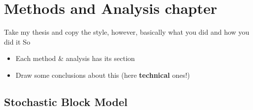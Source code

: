 \chapter{Methods and Analysis chapter}

Take my thesis and copy the style, however, basically what you did and how you did it 
So 
\begin{itemize}
    \item Each method \& analysis has its section
    \item Draw some conclusions about this (here \textbf{technical} ones!)
\end{itemize}

\section{Stochastic Block Model}\label{sec:sbm}
\cite*{lee2019review}

